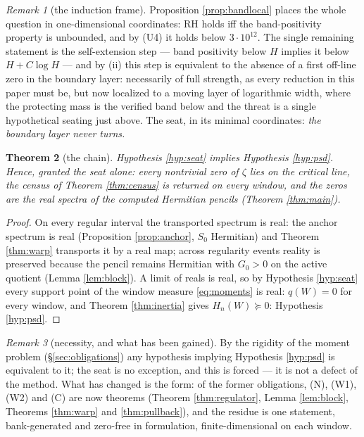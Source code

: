 \documentclass[11pt]{article}
\theoremstyle{plain}
\newtheorem{theorem}{Theorem}
\theoremstyle{definition}
\theoremstyle{remark}
\newtheorem{remark}[theorem]{Remark}
\begin{document}
\begin{remark}[the induction frame]\label{rem:induction}
Proposition \ref{prop:bandlocal} places the whole question in one-dimensional
coordinates: RH holds iff the band-positivity property is unbounded, and by (U4) it
holds below $3\cdot10^{12}$. The single remaining statement is the self-extension
step --- band positivity below $H$ implies it below $H+C\log H$ --- and by (ii) this
step is equivalent to the absence of a first off-line zero in the boundary layer:
necessarily of full strength, as every reduction in this paper must be, but now
localized to a moving layer of logarithmic width, where the protecting mass is the
verified band below and the threat is a single hypothetical seating just above. The
seat, in its minimal coordinates: \emph{the boundary layer never turns.}
\end{remark}

\begin{theorem}[the chain]\label{thm:chain}
Hypothesis \ref{hyp:seat} implies Hypothesis \ref{hyp:psd}. Hence, granted the seat
alone: every nontrivial zero of $\zeta$ lies on the critical line, the census of
Theorem \ref{thm:census} is returned on every window, and the zeros are the real
spectra of the computed Hermitian pencils (Theorem \ref{thm:main}).
\end{theorem}

\begin{proof}
On every regular interval the transported spectrum is real: the anchor spectrum is real
(Proposition \ref{prop:anchor}, $S_0$ Hermitian) and Theorem \ref{thm:warp} transports
it by a real map; across regularity events reality is preserved because the pencil
remains Hermitian with $G_0>0$ on the active quotient (Lemma \ref{lem:block}). A limit
of reals is real, so by Hypothesis \ref{hyp:seat} every support point of the window
measure \eqref{eq:moments} is real: $q(W)=0$ for every window, and Theorem
\ref{thm:inertia} gives $H_n(W)\succeq0$: Hypothesis \ref{hyp:psd}.
\end{proof}

\begin{remark}[necessity, and what has been gained]
By the rigidity of the moment problem (\S\ref{sec:obligations}) any hypothesis implying
Hypothesis \ref{hyp:psd} is equivalent to it; the seat is no exception, and this is
forced --- it is not a defect of the method. What has changed is the form: of the former
obligations, (N), (W1), (W2) and (C) are now theorems (Theorem \ref{thm:regulator},
Lemma \ref{lem:block}, Theorems \ref{thm:warp} and \ref{thm:pullback}), and the residue
is one statement, bank-generated and zero-free in formulation, finite-dimensional on
each window.
\end{remark}
\end{document}
